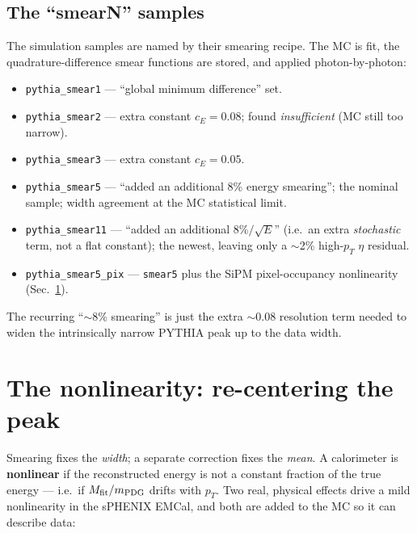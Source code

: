 \documentclass[11pt]{article}
\begin{document}
\subsection{The ``smearN'' samples}
The simulation samples are named by their smearing recipe. The MC is fit, the
quadrature-difference smear functions are stored, and applied photon-by-photon:
\begin{itemize}[nosep]
  \item \texttt{pythia\_smear1} --- ``global minimum difference'' set.
  \item \texttt{pythia\_smear2} --- extra constant $c_E=0.08$; found
        \emph{insufficient} (MC still too narrow).
  \item \texttt{pythia\_smear3} --- extra constant $c_E=0.05$.
  \item \texttt{pythia\_smear5} --- ``added an additional 8\% energy smearing'';
        the nominal sample; width agreement at the MC statistical limit.
  \item \texttt{pythia\_smear11} --- ``added an additional $8\%/\sqrt{E}$''
        (i.e.\ an extra \emph{stochastic} term, not a flat constant); the newest,
        leaving only a $\sim$2\% high-$p_T$ $\eta$ residual.
  \item \texttt{pythia\_smear5\_pix} --- \texttt{smear5} plus the SiPM
        pixel-occupancy nonlinearity (Sec.~\ref{sec:nonlin}).
\end{itemize}
The recurring ``$\sim$8\% smearing'' is just the extra $\sim$0.08 resolution
term needed to widen the intrinsically narrow PYTHIA peak up to the data width.

\section{The nonlinearity: re-centering the peak}
\label{sec:nonlin}

Smearing fixes the \emph{width}; a separate correction fixes the \emph{mean}.
A calorimeter is \textbf{nonlinear} if the reconstructed energy is not a constant
fraction of the true energy --- i.e.\ if $M_{\rm fit}/m_{\rm PDG}$ drifts with
$p_T$. Two real, physical effects drive a mild nonlinearity in the sPHENIX EMCal,
and both are added to the MC so it can describe data:
\end{document}
